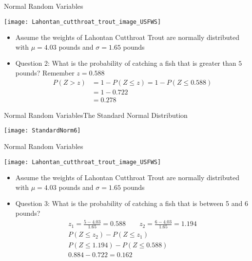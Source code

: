 \documentclass[xcolor=dvipsnames]{beamer}
\begin{document}
\begin{frame}{Normal Random Variables}
	\begin{center}
		\texttt{[image: Lahontan\_cutthroat\_trout\_image\_USFWS]}
	\end{center}
	\begin{itemize}
		\item Assume the weights of Lahontan Cutthroat Trout are normally distributed with $\mu = 4.03$ pounds and $\sigma = 1.65$ pounds
		\item Question 2: What is the probability of catching a fish that is greater than $5$ pounds? Remember $z = 0.588$
		\begin{align*}
		P(Z > z) &= 1 - P(Z \leq z) = 1 - P(Z \leq 0.588)\\
		&= 1 - 0.722 \\
		&= 0.278
		\end{align*}
	\end{itemize}
\end{frame}

\begin{frame}{Normal Random Variables}{The Standard Normal Distribution}
	\begin{center}
		\texttt{[image: StandardNorm6]}
	\end{center}
\end{frame}

\begin{frame}{Normal Random Variables}
	\begin{center}
		\texttt{[image: Lahontan\_cutthroat\_trout\_image\_USFWS]}
	\end{center}
	\begin{itemize}
		\item Assume the weights of Lahontan Cutthroat Trout are normally distributed with $\mu = 4.03$ pounds and $\sigma = 1.65$ pounds
		\item Question 3: What is the probability of catching a fish that is between 5 and 6 pounds?
		\begin{gather*}
		z_1 = \frac{5-4.03}{1.65} = 0.588 \quad \quad z_2 = \frac{6-4.03}{1.65} = 1.194\\
		P(Z \leq z_2) - P(Z \leq z_1) \\
		P(Z \leq 1.194) - P(Z \leq 0.588) \\
		0.884 - 0.722 =  0.162
		\end{gather*}
	\end{itemize}
\end{frame}
\end{document}
